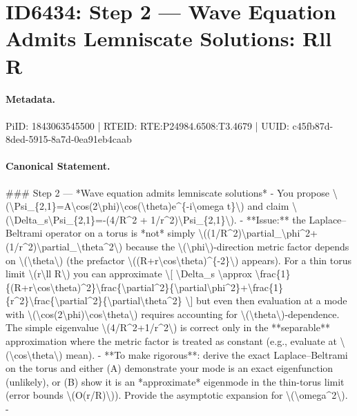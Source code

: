 \section*{ID6434: Step 2 — Wave Equation Admits Lemniscate Solutions: Rll R}
\paragraph{Metadata.}
PiID: 1843063545500 | RTEID: RTE:P24984.6508:T3.4679 | UUID: c45fb87d-8ded-5915-8a7d-0ea91eb4caab

\paragraph{Canonical Statement.}
\#\#\# Step 2 — *Wave equation admits lemniscate solutions* - You propose \textbackslash{}(\textbackslash{}Psi\_\{2,1\}=A\textbackslash{}cos(2\textbackslash{}phi)\textbackslash{}cos(\textbackslash{}theta)e\textasciicircum{}\{-i\textbackslash{}omega t\}\textbackslash{}) and claim \textbackslash{}(\textbackslash{}Delta\_s\textbackslash{}Psi\_\{2,1\}=-(4/R\textasciicircum{}2 + 1/r\textasciicircum{}2)\textbackslash{}Psi\_\{2,1\}\textbackslash{}). - **Issue:** the Laplace–Beltrami operator on a torus is *not* simply \textbackslash{}((1/R\textasciicircum{}2)\textbackslash{}partial\_\textbackslash{}phi\textasciicircum{}2+(1/r\textasciicircum{}2)\textbackslash{}partial\_\textbackslash{}theta\textasciicircum{}2\textbackslash{}) because the \textbackslash{}(\textbackslash{}phi\textbackslash{})-direction metric factor depends on \textbackslash{}(\textbackslash{}theta\textbackslash{}) (the prefactor \textbackslash{}((R+r\textbackslash{}cos\textbackslash{}theta)\textasciicircum{}\{-2\}\textbackslash{}) appears). For a thin torus limit \textbackslash{}(r\textbackslash{}ll R\textbackslash{}) you can approximate \textbackslash{}[ \textbackslash{}Delta\_s \textbackslash{}approx \textbackslash{}frac\{1\}\{(R+r\textbackslash{}cos\textbackslash{}theta)\textasciicircum{}2\}\textbackslash{}frac\{\textbackslash{}partial\textasciicircum{}2\}\{\textbackslash{}partial\textbackslash{}phi\textasciicircum{}2\}+\textbackslash{}frac\{1\}\{r\textasciicircum{}2\}\textbackslash{}frac\{\textbackslash{}partial\textasciicircum{}2\}\{\textbackslash{}partial\textbackslash{}theta\textasciicircum{}2\} \textbackslash{}] but even then evaluation at a mode with \textbackslash{}(\textbackslash{}cos(2\textbackslash{}phi)\textbackslash{}cos\textbackslash{}theta\textbackslash{}) requires accounting for \textbackslash{}(\textbackslash{}theta\textbackslash{})-dependence. The simple eigenvalue \textbackslash{}(4/R\textasciicircum{}2+1/r\textasciicircum{}2\textbackslash{}) is correct only in the **separable** approximation where the metric factor is treated as constant (e.g., evaluate at \textbackslash{}(\textbackslash{}cos\textbackslash{}theta\textbackslash{}) mean). - **To make rigorous**: derive the exact Laplace–Beltrami on the torus and either (A) demonstrate your mode is an exact eigenfunction (unlikely), or (B) show it is an *approximate* eigenmode in the thin-torus limit (error bounds \textbackslash{}(O(r/R)\textbackslash{})). Provide the asymptotic expansion for \textbackslash{}(\textbackslash{}omega\textasciicircum{}2\textbackslash{}). - 